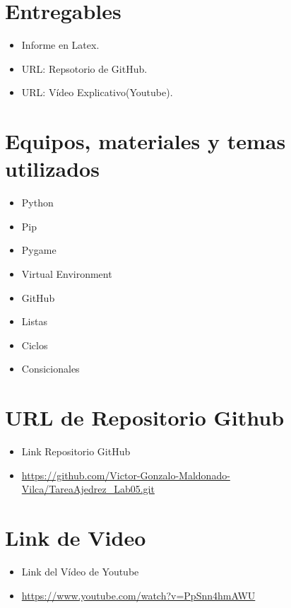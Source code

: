 \documentclass{article}
\begin{document}
 
  \section{Entregables}
  \begin{itemize}
    \item Informe en Latex.
    \item URL: Repsotorio de GitHub.
    \item URL: Vídeo Explicativo(Youtube).
  \end{itemize}
  
		
	\section{Equipos, materiales y temas utilizados}
  \begin{itemize}
    \item Python
    \item Pip
    \item Pygame
    \item Virtual Environment
    \item GitHub
    \item Listas
    \item Ciclos
    \item Consicionales
  \end{itemize}
 

  \section{URL de Repositorio Github}
  \begin{itemize}
    \item Link Repositorio GitHub
    \item \url{https://github.com/Victor-Gonzalo-Maldonado-Vilca/TareaAjedrez_Lab05.git}
  \end{itemize}
    

  \section{Link de Video}
  \begin{itemize}
    \item Link del Vídeo de Youtube
    \item \url{https://www.youtube.com/watch?v=PpSnn4hmAWU}
  \end{itemize}
\end{document}
